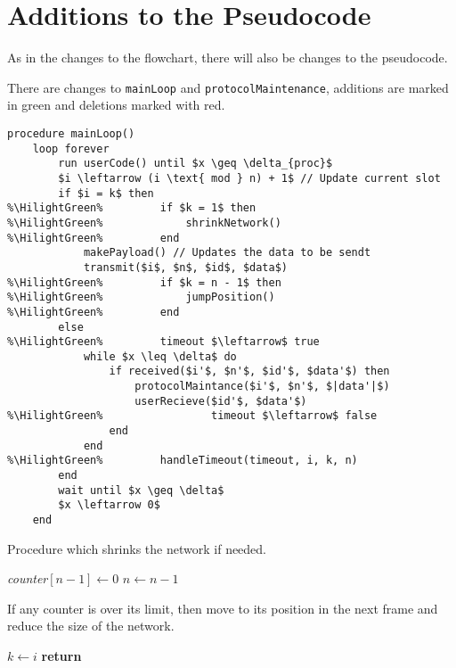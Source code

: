 \section{Additions to the Pseudocode}
As in the changes to the flowchart, there will also be changes to the pseudocode. 

There are changes to \texttt{mainLoop} and \texttt{protocolMaintenance}, additions are marked in green and deletions marked with red.

\begin{lstlisting}[style=pseudocode,mathescape=true,float, label={lst:general_case2}, caption={Modifications to the previous pseudocode are highlighted in green.}, escapechar=\%] 
procedure mainLoop()
	loop forever
		run userCode() until $x \geq \delta_{proc}$
		$i \leftarrow (i \text{ mod } n) + 1$ // Update current slot
		if $i = k$ then
%\HilightGreen%			if $k = 1$ then
%\HilightGreen%				shrinkNetwork()
%\HilightGreen%			end
			makePayload() // Updates the data to be sendt
			transmit($i$, $n$, $id$, $data$)
%\HilightGreen%			if $k = n - 1$ then
%\HilightGreen%				jumpPosition()
%\HilightGreen%			end
		else
%\HilightGreen%			timeout $\leftarrow$ true
			while $x \leq \delta$ do
				if received($i'$, $n'$, $id'$, $data'$) then
					protocolMaintance($i'$, $n'$, $|data'|$)
					userRecieve($id'$, $data'$)
%\HilightGreen%					timeout $\leftarrow$ false
				end
			end
%\HilightGreen%			handleTimeout(timeout, i, k, n)
		end
		wait until $x \geq \delta$
		$x \leftarrow 0$ 
	end
\end{lstlisting} 

\begin{algorithm}[h]
\caption{Procedure which shrinks the network if needed.}
\label{lst:general_case5}
\begin{algorithmic}[1]
        \CState \textit{counter}$[n-1] \gets 0$
        \CState $n \gets n - 1$
    \EndIf
\EndProcedure
\end{algorithmic}    
\end{algorithm} 

\begin{algorithm}[h]
\caption{If any counter is over its limit, then move to its position in the next frame and reduce the size of the network.}
\label{lst:general_case4}
\begin{algorithmic}[1]
            \State $k \gets i$
            \State \textbf{return}
        \EndIf
    \EndFor 
\EndProcedure
\end{algorithmic}    
\end{algorithm} 

